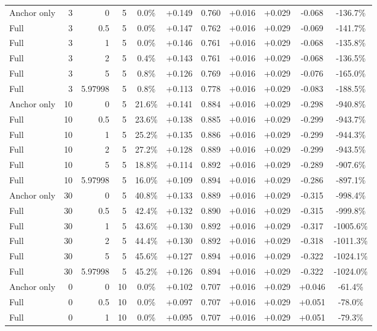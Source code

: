 \begin{table}[htbp]
\begin{tabular}{lrrrccccccc}
Anchor only & 3 & 0 & 5 & 0.0\% & +0.149 & 0.760 & +0.016 & +0.029 & -0.068 & -136.7\% \\
Full & 3 & 0.5 & 5 & 0.0\% & +0.147 & 0.762 & +0.016 & +0.029 & -0.069 & -141.7\% \\
Full & 3 & 1 & 5 & 0.0\% & +0.146 & 0.761 & +0.016 & +0.029 & -0.068 & -135.8\% \\
Full & 3 & 2 & 5 & 0.4\% & +0.143 & 0.761 & +0.016 & +0.029 & -0.068 & -136.5\% \\
Full & 3 & 5 & 5 & 0.8\% & +0.126 & 0.769 & +0.016 & +0.029 & -0.076 & -165.0\% \\
Full & 3 & 5.97998 & 5 & 0.8\% & +0.113 & 0.778 & +0.016 & +0.029 & -0.083 & -188.5\% \\
Anchor only & 10 & 0 & 5 & 21.6\% & +0.141 & 0.884 & +0.016 & +0.029 & -0.298 & -940.8\% \\
Full & 10 & 0.5 & 5 & 23.6\% & +0.138 & 0.885 & +0.016 & +0.029 & -0.299 & -943.7\% \\
Full & 10 & 1 & 5 & 25.2\% & +0.135 & 0.886 & +0.016 & +0.029 & -0.299 & -944.3\% \\
Full & 10 & 2 & 5 & 27.2\% & +0.128 & 0.889 & +0.016 & +0.029 & -0.299 & -943.5\% \\
Full & 10 & 5 & 5 & 18.8\% & +0.114 & 0.892 & +0.016 & +0.029 & -0.289 & -907.6\% \\
Full & 10 & 5.97998 & 5 & 16.0\% & +0.109 & 0.894 & +0.016 & +0.029 & -0.286 & -897.1\% \\
Anchor only & 30 & 0 & 5 & 40.8\% & +0.133 & 0.889 & +0.016 & +0.029 & -0.315 & -998.4\% \\
Full & 30 & 0.5 & 5 & 42.4\% & +0.132 & 0.890 & +0.016 & +0.029 & -0.315 & -999.8\% \\
Full & 30 & 1 & 5 & 43.6\% & +0.130 & 0.892 & +0.016 & +0.029 & -0.317 & -1005.6\% \\
Full & 30 & 2 & 5 & 44.4\% & +0.130 & 0.892 & +0.016 & +0.029 & -0.318 & -1011.3\% \\
Full & 30 & 5 & 5 & 45.6\% & +0.127 & 0.894 & +0.016 & +0.029 & -0.322 & -1024.1\% \\
Full & 30 & 5.97998 & 5 & 45.2\% & +0.126 & 0.894 & +0.016 & +0.029 & -0.322 & -1024.0\% \\
Anchor only & 0 & 0 & 10 & 0.0\% & +0.102 & 0.707 & +0.016 & +0.029 & +0.046 & -61.4\% \\
Full & 0 & 0.5 & 10 & 0.0\% & +0.097 & 0.707 & +0.016 & +0.029 & +0.051 & -78.0\% \\
Full & 0 & 1 & 10 & 0.0\% & +0.095 & 0.707 & +0.016 & +0.029 & +0.051 & -79.3\% \\

\end{tabular}
\end{table}
